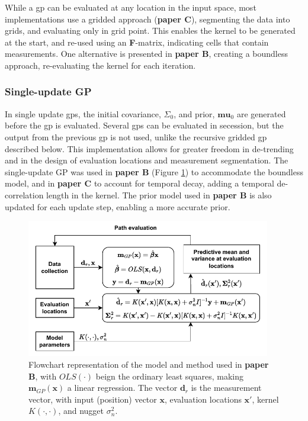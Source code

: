 While a \acrshort{gp} can be evaluated at any location in the input space, most implementations use a gridded approach\cite{kemna2016adaptive,berget2018adaptive} (\textbf{paper C}), segmenting the data into grids, and evaluating only in grid point. This enables the kernel to be generated at the start, and re-used using an \textbf{F}-matrix, indicating cells that contain measurements\cite{eidsvik2015value}. One alternative is presented in \textbf{paper B}, creating a boundless approach, re-evaluating the kernel for each iteration. 

\subsubsection*{Single-update GP}
In single update \acrshort{gp}s, the initial covariance, $\Sigma_0$, and prior, $\mathbf{mu}_0$ are generated before the \acrshort{gp} is evaluated. Several  \acrshort{gp}s can be evaluated in secession, but the output from the previous \acrshort{gp} is not used, unlike the recursive gridded \acrshort{gp} described below. This implementation allows for greater freedom in de-trending and in the design of evaluation locations and measurement segmentation. The single-update GP was used in \textbf{paper B} (Figure \ref{fig:dmodflow}) to accommodate the boundless model, and in \textbf{paper C} to account for temporal decay, adding a temporal de-correlation length in the kernel. The prior model used in \textbf{paper B} is also updated for each update step, enabling a more accurate prior. 

\begin{figure}
    \centering
    \includegraphics[width=0.95\textwidth]{figures/douromodelflow3-1.pdf}
    \caption{Flowchart representation of the model and method used in \textbf{paper B}, with $OLS(\cdot)$ beign the ordinary least squares, making $\mathbf{m}_{GP}(\mathbf{x})$ a linear regression. The vector $\mathbf{d}_r$ is the measurement vector, with input (position) vector $\mathbf{x}$, evaluation locations $\mathbf{x}'$, kernel $K(\cdot,\cdot)$, and nugget $\sigma^2_n$.}
    \label{fig:dmodflow}
\end{figure}

